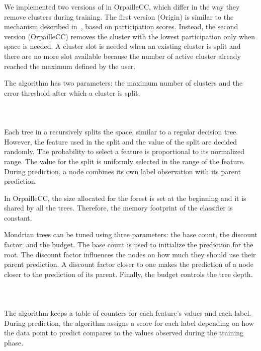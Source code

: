 We implemented two versions of \mcnn in OrpailleCC,
which differ in the way they remove clusters
during training. The first version (\mcnn Origin)
is similar to the mechanism described
in~\cite{mc-nn}, based on participation scores.
Instead, the second version (\mcnn OrpailleCC)
removes the cluster with the lowest participation
only when space is needed.  A cluster slot is
needed when an existing cluster is split and there are
no more slot available because the number of
active cluster already reached the maximum defined
by the user.

The \mcnn algorithm has two
parameters: the maximum number of clusters and the
error threshold after which a cluster is split. 


\paragraph{\mondrianforest~\cite{mondrian2014}}
Each tree in a \mondrianforest recursively
splits the space, similar to a regular decision tree.
However, the feature used in the split and the value of the
split are decided randomly. The probability to select a feature is 
proportional to its normalized range. The value for the split is
uniformly selected in the range of the feature. During prediction, a node
combines its own label observation  with its parent prediction.

In OrpailleCC, the size allocated for the forest
is set at the beginning and it is shared by all
the trees.  Therefore, the memory footprint of the
classifier is constant.

Mondrian trees can be tuned using three
parameters: the base count, the discount factor,
and the budget. The base count is used to
initialize the prediction for the root. The
discount factor influences the nodes on how much
they should use their parent prediction. A
discount factor closer to one makes the prediction
of a node closer to the prediction of its parent.
Finally, the budget controls the tree depth.

\paragraph{\naivebayes~\cite{naive_bayes}}
The \naivebayes algorithm keeps a table of
counters for each feature's values and each label.
During prediction, the algorithm assigns a
score for each label depending on how the data
point to predict compares to the values observed
during the training phase.


